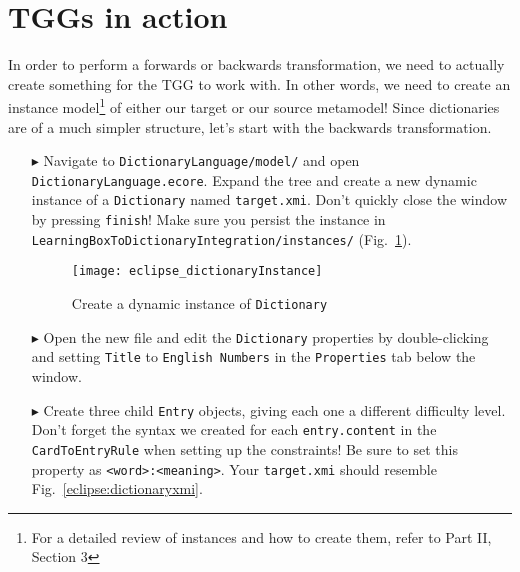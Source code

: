 \newpage
\section{TGGs in action}
\genHeader
\label{sect:TGGs_in_Action}

In order to perform a forwards or backwards transformation, we need to actually create something for the TGG to work with. In other words, we need to create an
instance model\footnote{For a detailed review of instances and how to create them, refer to Part II, Section 3} of either our target or our source metamodel!
Since dictionaries are of a much simpler structure, let's start with the backwards transformation.

\begin{itemize}

\item[$\blacktriangleright$] Navigate to \texttt{Dictionary\-Language/model/} and open \texttt{Dictio\-nary\-Lang\-uage.ecore}. Expand the tree and create a new
dynamic instance of a \texttt{Dictionary} named \texttt{target.xmi}. Don't quickly close the window by pressing \texttt{finish}! Make sure you persist the instance in
\texttt{Learn\-ing\-Box\-To\-Dictionary\-In\-te\-gra\-tion/in\-stan\-ces/} (Fig.~\ref{eclipse:create_instance_dict}).

\begin{figure}[htbp]
\begin{center}
  \texttt{[image: eclipse\_dictionaryInstance]}
  \caption{Create a dynamic instance of \texttt{Dictionary}}
  \label{eclipse:create_instance_dict}
\end{center}
\end{figure}

\newpage

\item[$\blacktriangleright$] Open the new file and edit the \texttt{Dictionary} properties by double-clicking and setting \texttt{Title} to \texttt{English
Numbers} in the \texttt{Properties} tab below the window.

\vspace{0.5cm}

\item[$\blacktriangleright$] Create three child \texttt{Entry} objects, giving each one a different difficulty level. Don't forget the syntax we created for
each \texttt{entry.content} in the \texttt{CardToEntryRule} when setting up the constraints! Be sure to set this property as \texttt{<word>:<meaning>}. Your
\texttt{target.xmi} should resemble Fig.~\ref{eclipse:dictionaryxmi}.


\end{itemize}
